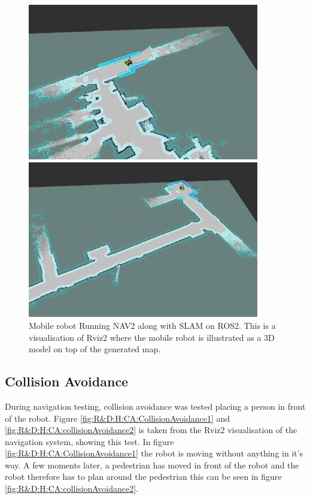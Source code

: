 \begin{figure}[ht]
  \centering
  \begin{minipage}[b]{0.49\textwidth}
        \centering
        \includegraphics[width = 0.9\textwidth]{Figures/figNavUia2.png}
  \end{minipage}
  \hfill
  \begin{minipage}[b]{0.49\textwidth}
    \centering
    \includegraphics[width = 0.9\textwidth]{Figures/figNavUia4.png}
  \end{minipage}
  \caption{Mobile robot Running NAV2 along with SLAM on ROS2. This is a visualisation of Rviz2 where the mobile robot is illustrated as a 3D model on top of the generated map.}
  \label{fig:R&D:H:SLAM:figNavUia}
\end{figure}


\subsection{Collision Avoidance}
During navigation testing, collision avoidance was tested placing a person in front of the robot. Figure \ref{fig:R&D:H:CA:CollisionAvoidance1} and \ref{fig:R&D:H:CA:collisionAvoidance2} is taken from the Rviz2 visualisation of the navigation system, showing this test. In figure \ref{fig:R&D:H:CA:CollisionAvoidance1} the robot is moving without anything in it's way. A few moments later, a pedestrian has moved in front of the robot and the robot therefore has to plan around the pedestrian this can be seen in figure \ref{fig:R&D:H:CA:collisionAvoidance2}.

